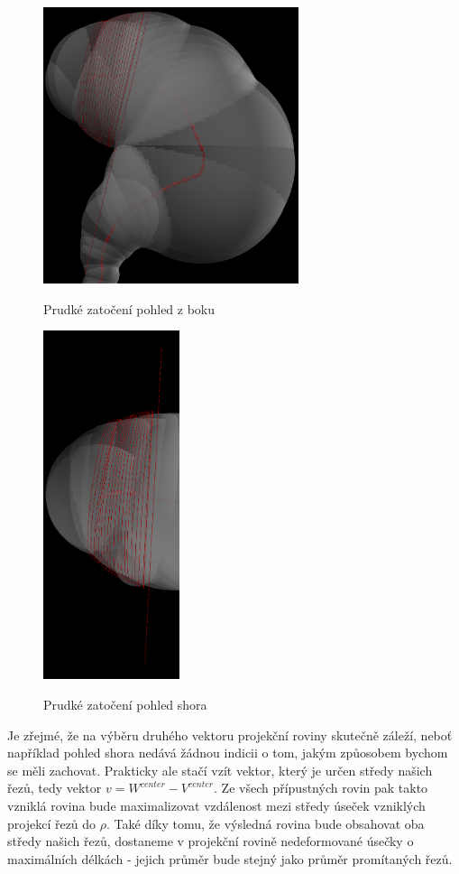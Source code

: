 \begin{figure}[ht]
\begin{minipage}{.6\textwidth}
  \centering
        \includegraphics[width=75mm]{img/sharp_curve_lookahead.png}
        \caption{Prudké zatočení pohled z boku}
    \centering
    \label{fig:sharp_curve_lookahead}
\end{minipage}%
\begin{minipage}{.4\textwidth}
    \centering
        \includegraphics[width=40mm]{img/sharp_curve_lookahead_up.png}
        \caption{Prudké zatočení pohled shora}
    \centering
    \label{fig:sharp_curve_lookahead_from_up}
\end{minipage}
\end{figure}

Je zřejmé, že na výběru druhého vektoru projekční roviny skutečně záleží, neboť
například pohled shora nedává žádnou indicii o tom, jakým způosobem bychom
se měli zachovat. Prakticky ale stačí vzít vektor, který je
určen středy našich řezů, tedy vektor $ v = W^{center} - V^{center} $. Ze všech
přípustných rovin pak takto vzniklá rovina bude maximalizovat vzdálenost mezi
středy úseček vzniklých projekcí řezů do $ \rho $. Také díky tomu, že
výsledná rovina bude obsahovat oba středy našich řezů, dostaneme v projekční
rovině nedeformované úsečky o maximálních délkách - jejich průměr bude stejný
jako průměr promítaných řezů.


